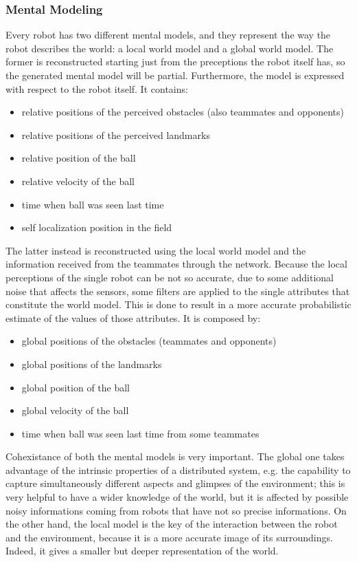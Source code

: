 \documentclass[a4paper, onecolumn, 12pt]{article}
\begin{document}
\subsubsection{Mental Modeling}
\label{subsec:mental_model}
Every robot has two different mental models, and they represent the way the robot 
describes the world: a local world model and a global world model.
The former is reconstructed starting just from the preceptions the robot itself has,
so the generated mental model will be partial. Furthermore, the model is expressed 
with respect to the robot itself.
It contains:
\begin{itemize}
    \item relative positions of the perceived obstacles (also teammates and opponents)
    \item relative positions of the perceived landmarks
    \item relative position of the ball
    \item relative velocity of the ball
    \item time when ball was seen last time
    \item self localization position in the field
\end{itemize}

The latter instead is reconstructed using the local world model and the information
received from the teammates through the network. Because the local perceptions of the 
single robot can be not so accurate, due to some additional noise that affects the sensors,
some filters are applied to the single attributes that constitute the world model. This 
is done to result in a more accurate probabilistic estimate of the values of those attributes.
It is composed by:
\begin{itemize}
    \item global positions of the obstacles (teammates and opponents)
    \item global positions of the landmarks
    \item global position of the ball
    \item global velocity of the ball
    \item time when ball was seen last time from some teammates
\end{itemize}

Cohexistance of both the mental models is very important.
The global one takes advantage of the intrinsic properties of a 
distributed system, e.g. the capability to capture simultaneously different
aspects and glimpses of the environment; this is very helpful to have a wider
knowledge of the world, but it is affected by possible noisy informations coming 
from robots that have not so precise informations.
On the other hand, the local model is the key of the interaction between the robot and
the environment, because it is a more accurate image of its surroundings.
Indeed, it gives a smaller but deeper representation of the world.
\end{document}

